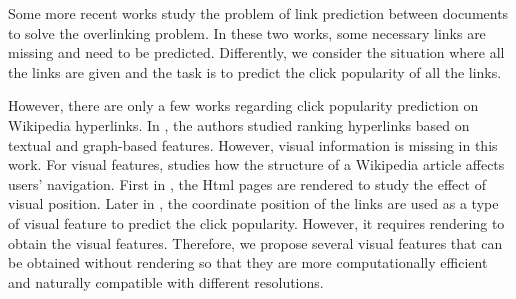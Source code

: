 Some more recent works \cite{brochier2021predicting, gundala2018readers} study the problem of link prediction between documents to solve the overlinking problem. In these two works, some necessary links are missing and need to be predicted. Differently, we consider the situation where all the links are given and the task is to predict the click popularity of all the links.

However, there are only a few works regarding click popularity prediction on Wikipedia hyperlinks. In \cite{thruesen2016link}, the authors studied ranking hyperlinks based on textual and graph-based features. However, visual information is missing in this work. For visual features, \cite{lamprecht2017structure} studies how the structure of a Wikipedia article affects users' navigation. First in \cite{dimitrov2016visual}, the Html pages are rendered to study the effect of visual position. Later in \cite{dimitrov2017makes}, the coordinate position of the links are used as a type of visual feature to predict the click popularity. However, it requires rendering to obtain the visual features. Therefore, we propose several visual features that can be obtained without rendering so that they are more computationally efficient and naturally compatible with different resolutions.

